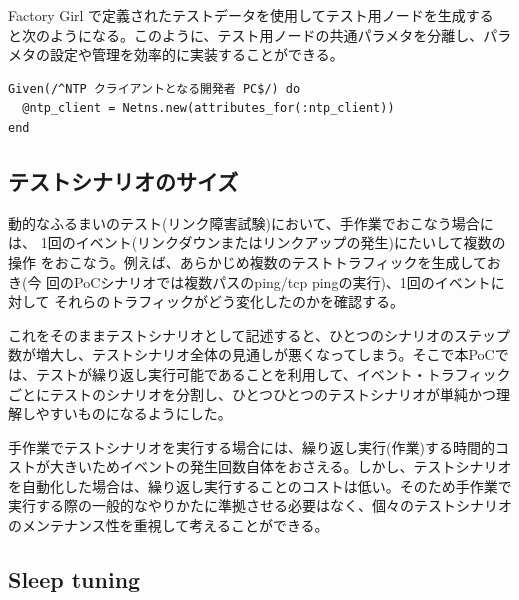 Factory Girl で定義されたテストデータを使用してテスト用ノードを生成する
と次のようになる。このように、テスト用ノードの共通パラメタを分離し、パラ
メタの設定や管理を効率的に実装することができる。
\begin{lstlisting}
Given(/^NTP クライアントとなる開発者 PC$/) do
  @ntp_client = Netns.new(attributes_for(:ntp_client))
end
\end{lstlisting}

  \subsection{テストシナリオのサイズ}


動的なふるまいのテスト(リンク障害試験)において、手作業でおこなう場合には、
1回のイベント(リンクダウンまたはリンクアップの発生)にたいして複数の操作
をおこなう。例えば、あらかじめ複数のテストトラフィックを生成しておき(今
回のPoCシナリオでは複数パスのping/tcp pingの実行)、1回のイベントに対して
それらのトラフィックがどう変化したのかを確認する。

これをそのままテストシナリオとして記述すると、ひとつのシナリオのステップ
数が増大し、テストシナリオ全体の見通しが悪くなってしまう。そこで本PoCで
は、テストが繰り返し実行可能であることを利用して、イベント・トラフィック
ごとにテストのシナリオを分割し、ひとつひとつのテストシナリオが単純かつ理
解しやすいものになるようにした。

手作業でテストシナリオを実行する場合には、繰り返し実行(作業)する時間的コ
ストが大きいためイベントの発生回数自体をおさえる。しかし、テストシナリオ
を自動化した場合は、繰り返し実行することのコストは低い。そのため手作業で
実行する際の一般的なやりかたに準拠させる必要はなく、個々のテストシナリオ
のメンテナンス性を重視して考えることができる。

  \subsection{Sleep tuning}
  \label{sec:sleep-tuning}

